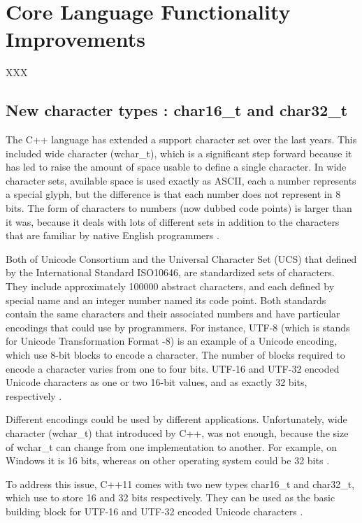 \documentclass[11pt]{report}
\begin{document}
\chapter{Core Language Functionality Improvements}
\label{chapter: Functionality Improvements}

XXX

\section{New character types : char16\_t and char32\_t}
\label{section: char16_t and char32_t}
The C++ language has extended a support character set over the last years. This included wide character (wchar\_t), which is a significant step forward because it has led to raise the amount of space usable to define a single character. In wide character sets, available space is used exactly as ASCII, each a number represents a special glyph, but the difference is that each number does not represent in 8 bits. The form of characters to numbers (now dubbed code points) is larger than it was, because it deals with lots of different sets in addition to the characters that are familiar by native English programmers \cite{Gregorie:professionalcpp}.


Both of Unicode Consortium and the Universal Character Set (UCS) that defined by the International Standard ISO10646, are standardized sets of characters. They include approximately 100000 abstract characters, and each defined by special name and an integer number named its code point. Both standards contain the same characters and their associated numbers and have particular encodings that could use by programmers. For instance, UTF-8 (which is stands for Unicode Transformation Format -8) is an example of a Unicode encoding, which use 8-bit blocks to encode a character. The number of blocks required to encode a character varies from one to four bits.  UTF-16 and UTF-32 encoded Unicode characters as one or two 16-bit values, and as exactly 32 bits, respectively \cite{Gregorie:professionalcpp}.


Different encodings could be used by different applications. Unfortunately, wide character (wchar\_t) that introduced by C++, was not enough, because the size of wchar\_t can change from one implementation to another. For example, on Windows it is 16 bits, whereas on other operating system could be 32 bits \cite{Gregorie:professionalcpp}. 


To address this issue, C++11 comes with two new types char16\_t and char32\_t, which use to store 16 and 32 bits respectively. They can be used as the basic building block for UTF-16 and UTF-32 encoded Unicode characters \cite{Josuttis:2012:CppStandardLibrary}.
\end{document}
